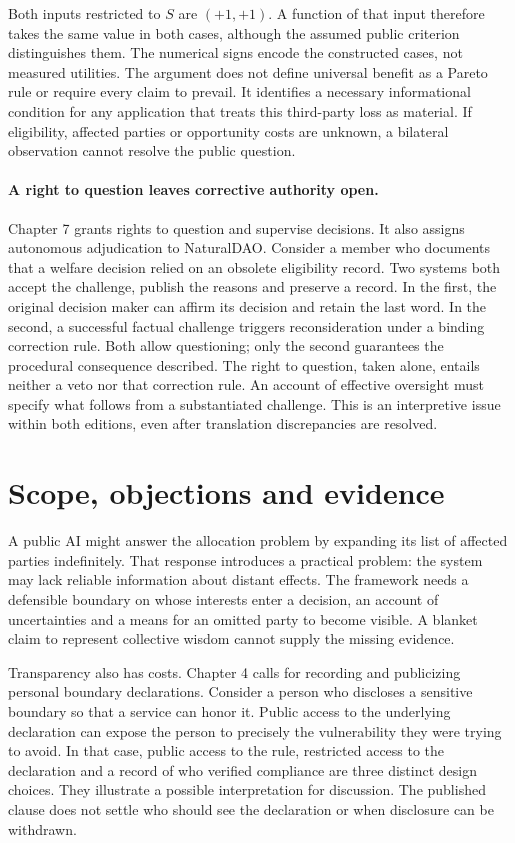 \documentclass[11pt]{article}
\begin{document}
Both inputs restricted to $S$ are $(+1,+1)$. A function of that input therefore takes the same value in both cases, although the assumed public criterion distinguishes them. The numerical signs encode the constructed cases, not measured utilities. The argument does not define universal benefit as a Pareto rule or require every claim to prevail. It identifies a necessary informational condition for any application that treats this third-party loss as material. If eligibility, affected parties or opportunity costs are unknown, a bilateral observation cannot resolve the public question.

\paragraph{A right to question leaves corrective authority open.}
Chapter 7 grants rights to question and supervise decisions. It also assigns autonomous adjudication to NaturalDAO. Consider a member who documents that a welfare decision relied on an obsolete eligibility record. Two systems both accept the challenge, publish the reasons and preserve a record. In the first, the original decision maker can affirm its decision and retain the last word. In the second, a successful factual challenge triggers reconsideration under a binding correction rule. Both allow questioning; only the second guarantees the procedural consequence described. The right to question, taken alone, entails neither a veto nor that correction rule. An account of effective oversight must specify what follows from a substantiated challenge. This is an interpretive issue within both editions, even after translation discrepancies are resolved.

\section{Scope, objections and evidence}
A public AI might answer the allocation problem by expanding its list of affected parties indefinitely. That response introduces a practical problem: the system may lack reliable information about distant effects. The framework needs a defensible boundary on whose interests enter a decision, an account of uncertainties and a means for an omitted party to become visible. A blanket claim to represent collective wisdom cannot supply the missing evidence.

Transparency also has costs. Chapter 4 calls for recording and publicizing personal boundary declarations. Consider a person who discloses a sensitive boundary so that a service can honor it. Public access to the underlying declaration can expose the person to precisely the vulnerability they were trying to avoid. In that case, public access to the rule, restricted access to the declaration and a record of who verified compliance are three distinct design choices. They illustrate a possible interpretation for discussion. The published clause does not settle who should see the declaration or when disclosure can be withdrawn.
\end{document}
